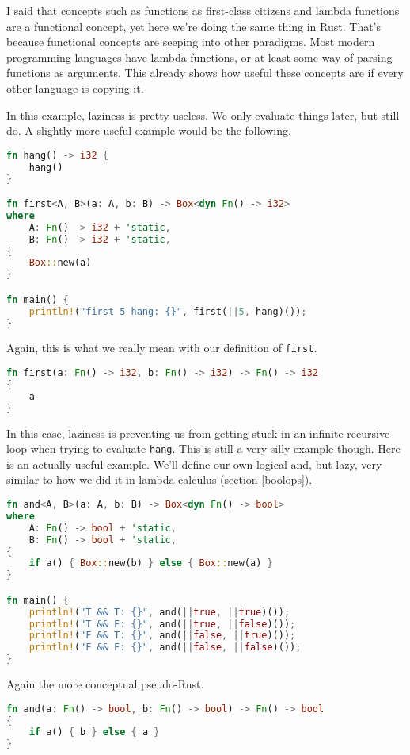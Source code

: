 \documentclass[11pt]{article}
\begin{document}
I said that concepts such as functions as first-class citizens and lambda
functions are a functional concept, yet here we're doing the same thing in
Rust. That's because functional concepts are seeping into other paradigms. Most
modern programming languages have lambda functions, or at least some way of
parsing functions as arguments. This already shows how useful these concepts
are if every other language is copying it.

In this example, laziness is pretty useless. We only evaluate things later, but
still do. A slightly more useful example would be the following.
\begin{lstlisting}[language=Rust]
fn hang() -> i32 {
    hang()
}

fn first<A, B>(a: A, b: B) -> Box<dyn Fn() -> i32>
where
    A: Fn() -> i32 + 'static,
    B: Fn() -> i32 + 'static,
{
    Box::new(a)
}

fn main() {
    println!("first 5 hang: {}", first(||5, hang)());
}
\end{lstlisting}
Again, this is what we really mean with our definition of \texttt{first}.
\begin{lstlisting}[language=Rust]
fn first(a: Fn() -> i32, b: Fn() -> i32) -> Fn() -> i32
{
    a
}
\end{lstlisting}

In this case, laziness is preventing us from getting stuck in an infinite
recursive loop when trying to evaluate \texttt{hang}. This is still a very
silly example though. Here is an actually useful example. We'll define our own
logical and, but lazy, very similar to how we did it in lambda calculus
(section \ref{boolops}).

\begin{lstlisting}[language=Rust]
fn and<A, B>(a: A, b: B) -> Box<dyn Fn() -> bool>
where
    A: Fn() -> bool + 'static,
    B: Fn() -> bool + 'static,
{
    if a() { Box::new(b) } else { Box::new(a) }
}

fn main() {
    println!("T && T: {}", and(||true, ||true)());
    println!("T && F: {}", and(||true, ||false)());
    println!("F && T: {}", and(||false, ||true)());
    println!("F && F: {}", and(||false, ||false)());
}
\end{lstlisting}
Again the more conceptual pseudo-Rust.
\begin{lstlisting}[language=Rust]
fn and(a: Fn() -> bool, b: Fn() -> bool) -> Fn() -> bool
{
    if a() { b } else { a }
}
\end{lstlisting}
\end{document}
